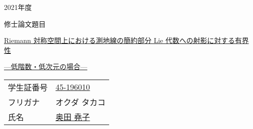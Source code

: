 \begin{titlepage}
\huge
\centering
{\Huge 2021年度}

\vspace{4cm}

\begin{center}
  修士論文題目
\end{center}

\centering
\noindent
\underline{\large Riemann 対称空間上における測地線の簡約部分 Lie 代数への射影に対する有界性}

\underline{\large ---低階数・低次元の場合---}

\vspace{10cm}

\Large
\raggedright
\begin{tabular}{ll}
学生証番号 \quad {} & \underline{45-196010} \\
フリガナ & オクダ タカコ \\
氏名 & \underline{奥田 堯子}
\end{tabular}

\end{titlepage}
